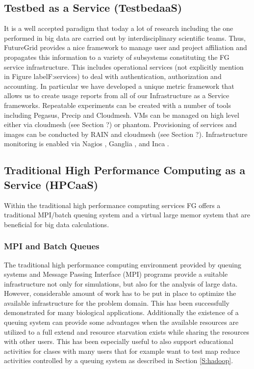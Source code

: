 \subsection{Testbed as a Service (TestbedaaS)}

It is a well accepted paradigm that today a lot of research including the one performed in big data are carried out by interdisciplinary scientific teams. Thus, FutureGrid provides a nice framework to manage user and project affiliation and propagates this information to a variety of subsystems constituting the FG service infrastructure. This includes operational services (not explicitly mention in Figure label{F:services}) to deal with authentication, authorization and accounting. In particular we have developed a unique metric framework that allows us to create usage reports from all of our Infrastructure as a Service frameworks. Repeatable experiments can be created with a number of tools including Pegasus, Precip and Cloudmesh. VMs can be managed on high level either via cloudmesh (see Section ?) or phantom. Provisioning of services and images can be conducted by RAIN \cite{?} and cloudmesh (see Section ?). Infrastructure monitoring is enabled via Nagios \cite{nagios}, Ganglia \cite{ganglia}, and Inca \cite{inca}.

\subsection{Traditional High Performance Computing as a Service (HPCaaS)}

Within the traditional high performance computing services FG offers a traditional MPI/batch queuing system and a virtual large memor system that are beneficial for big data calculations.

\subsubsection{MPI and Batch Queues}

The traditional high performance computing environment provided by queuing systems and Message Passing Interface (MPI) programs provide a suitable infrastructure not only for simulations, but also for the analysis of large data. However, considerable amount of work has to be put in place to optimize the available infrastructure for the problem domain. This has been successfully demonstrated for many biological applications. Additionally the existence of a queuing system can provide some advantages when the available resources are utilized to a full extend and resource starvation exists while sharing the resources with other users. This has been especially useful to also support educational activities for clases with many users that for example want to test map reduce activities controlled by a queuing system as described in Section \ref{S:hadoop}.

